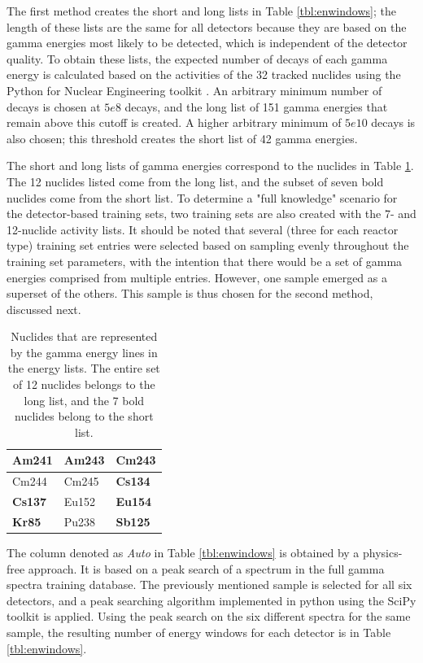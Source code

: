The first method creates the short and long lists in Table \ref{tbl:enwindows};
the length of these lists are the same for all detectors because they are based
on the gamma energies most likely to be detected, which is independent of the
detector quality. To obtain these lists, the expected number of decays of each
gamma energy is calculated based on the activities of the 32 tracked nuclides
using the Python for Nuclear Engineering toolkit \cite{pyne}.  An arbitrary
minimum number of decays is chosen at $5e8$ decays, and the long list of 151
gamma energies that remain above this cutoff is created. A higher arbitrary
minimum of $5e10$ decays is also chosen; this threshold creates the short list
of 42 gamma energies. 

The short and long lists of gamma energies correspond to the nuclides in Table
\ref{tbl:enlistnucs}. The 12 nuclides listed come from the long list, and the
subset of seven bold nuclides come from the short list.  To determine a "full
knowledge" scenario for the detector-based training sets, two training sets are
also created with the 7- and 12-nuclide activity lists.  It should be noted
that several (three for each reactor type) training set entries were selected
based on sampling evenly throughout the training set parameters, with the
intention that there would be a set of gamma energies comprised from multiple
entries. However, one sample emerged as a superset of the others. This sample
is thus chosen for the second method, discussed next.

\begin{table}[!htb]
  \centering
  \begin{tabular}{@{}|l|l|l|@{}}
    \hline
    \textbf{Am241} & \textbf{Am243} & Cm243          \\ \hline
    Cm244          & Cm245          & \textbf{Cs134} \\ \hline
    \textbf{Cs137} & Eu152          & \textbf{Eu154} \\ \hline
    \textbf{Kr85}  & Pu238          & \textbf{Sb125} \\ \hline
  \end{tabular}
  \caption{Nuclides that are represented by the gamma energy lines in the 
           energy lists. The entire set of 12 nuclides belongs to the long 
           list, and the 7 bold nuclides belong to the short list.}
  \label{tbl:enlistnucs}
\end{table}

The column denoted as \textit{Auto} in Table \ref{tbl:enwindows} is obtained by
a physics-free approach. It is based on a peak search of a spectrum in the full
gamma spectra training database. The previously mentioned sample is selected
for all six detectors, and a peak searching algorithm implemented in python
using the SciPy toolkit \cite{scipy} is applied. Using the peak search on the
six different spectra for the same sample, the resulting number of energy
windows for each detector is in Table \ref{tbl:enwindows}.  

